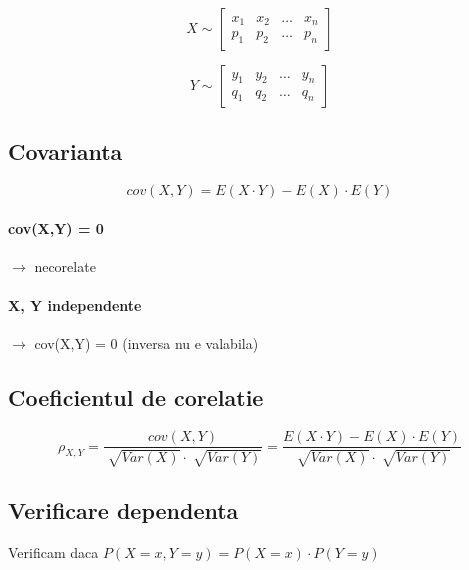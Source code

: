 \documentclass[oneside]{memoir}
\begin{document}
\begin{center}
    \begin{equation*}
X \sim \begin{bmatrix}
    x_1 & x_2 & \dots & x_n \\
    p_1 & p_2 & \dots & p_n
\end{bmatrix}
    \end{equation*}
\end{center}
\begin{center}
    \begin{equation*}
Y \sim \begin{bmatrix}
    y_1 & y_2 & \dots & y_n \\
    q_1 & q_2 & \dots & q_n
\end{bmatrix}
    \end{equation*}
\end{center}

\subsection*{Covarianta}
\begin{center}
    \begin{equation*}
cov(X,Y) = E(X\cdot Y) - E(X) \cdot E(Y)
    \end{equation*}
\end{center}
\paragraph*{cov(X,Y) = 0} $\rightarrow$ necorelate
\paragraph*{X, Y independente} $\rightarrow$ cov(X,Y) = 0 (inversa nu e valabila)

\subsection*{Coeficientul de corelatie}
\begin{center}
    \begin{equation*}
\rho_{X,Y} = \frac{cov(X,Y)}{\sqrt[]{Var(X)} \cdot \sqrt[]{Var(Y)}} = \frac{E(X\cdot Y) - E(X) \cdot E(Y)}{\sqrt[]{Var(X)} \cdot \sqrt[]{Var(Y)}}
    \end{equation*}
\end{center}


\subsection*{Verificare dependenta}
Verificam daca $P(X=x, Y=y) = P(X=x) \cdot P(Y=y)$
\end{document}
